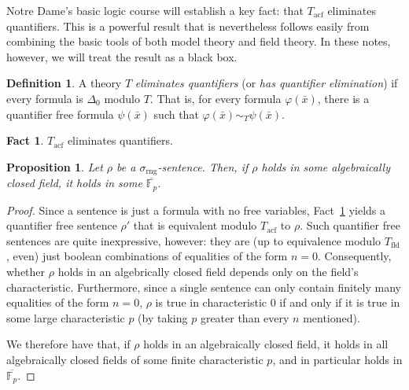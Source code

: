 \documentclass{article}
\theoremstyle{plain}
\newtheorem{prop}[thm]{Proposition}
\theoremstyle{definition}
\newtheorem{defn}[thm]{Definition}
\newtheorem{fact}[thm]{Fact}
\newcommand{\defterm}{\emph}
\newcommand{\ringsig}{\sigma_{\operatorname{rng}}}
\newcommand{\fieldthy}{T_{\operatorname{fld}}}
\newcommand{\acf}{T_{\operatorname{acf}}}
\newcommand{\tuple}{\bar}
\renewcommand{\phi}{\varphi}
\begin{document}
Notre Dame's basic logic course will establish a key fact: that $\acf$
eliminates quantifiers. This is a powerful result that is nevertheless
follows easily from combining the basic tools of both model theory and
field theory. In these notes, however, we will treat the result as a
black box.

\begin{defn}
  A theory $T$ \defterm{eliminates quantifiers} (or \defterm{has
    quantifier elimination}) if every formula is $\Delta_0$ modulo
  $T$. That is, for every formula $\phi(\tuple{x})$, there is a
  quantifier free formula $\psi(\tuple{x})$ such that $\phi(\tuple{x})
  \sim_T \psi(\tuple{x})$.
\end{defn}

\begin{fact}\label{fact:acf-qe}
  $\acf$ eliminates quantifiers.
\end{fact}

\begin{prop}\label{prop:anything-goestofinitecharacteristic}
  Let $\rho$ be a $\ringsig$-sentence. Then, if $\rho$ holds in some
  algebraically closed field, it holds in some
  $\overline{\mathbb{F}_p}$.
\end{prop}
\begin{proof}
  Since a sentence is just a formula with no free variables,
  Fact~\ref{fact:acf-qe} yields a quantifier free sentence $\rho'$
  that is equivalent modulo $\acf$ to $\rho$. Such quantifier free
  sentences are quite inexpressive, however: they are (up to
  equivalence modulo $\fieldthy$, even) just boolean combinations of
  equalities of the form $n = 0$. Consequently, whether $\rho$ holds
  in an algebrically closed field depends only on the field's
  characteristic. Furthermore, since a single sentence can only
  contain finitely many equalities of the form $n = 0$, $\rho$ is true
  in characteristic 0 if and only if it is true in some large
  characteristic $p$ (by taking $p$ greater than every $n$ mentioned).

  We therefore have that, if $\rho$ holds in an algebraically closed
  field, it holds in all algebraically closed fields of some finite
  characteristic $p$, and in particular holds in
  $\overline{\mathbb{F}_p}$.
\end{proof}
\end{document}
